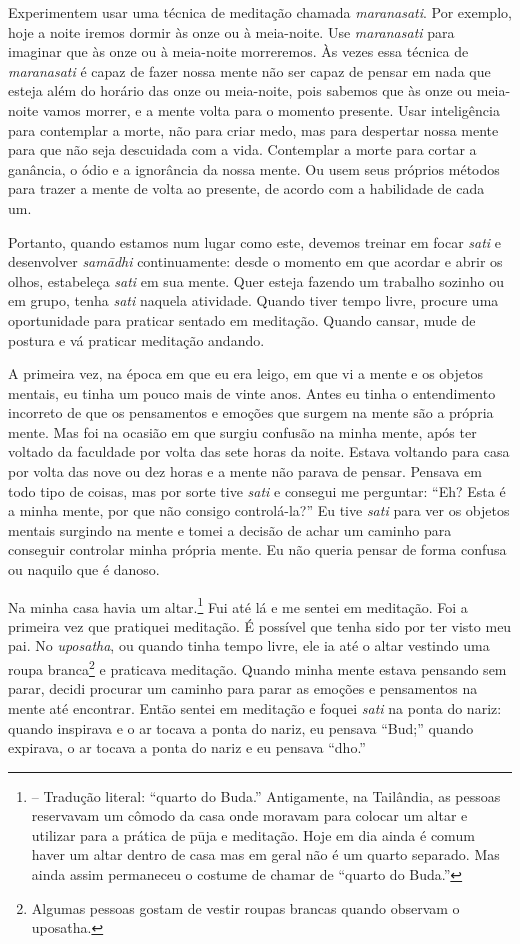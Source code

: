 Experimentem usar uma técnica de meditação chamada
\textit{maranasati}. Por exemplo, hoje a noite iremos dormir às onze ou
à meia-noite. Use \textit{maranasati} para imaginar que às onze ou à
meia-noite morreremos. Às vezes essa técnica de \textit{maranasati} é
capaz de fazer nossa mente não ser capaz de pensar em nada que esteja
além do horário das onze ou meia-noite, pois sabemos que às onze ou
meia-noite vamos morrer, e a mente volta para o momento presente. Usar
inteligência para contemplar a morte, não para criar medo, mas para
despertar nossa mente para que não seja descuidada com a vida.
Contemplar a morte para cortar a ganância, o ódio e a ignorância da
nossa mente. Ou usem seus próprios métodos para trazer a mente de volta
ao presente, de acordo com a habilidade de cada um.

Portanto, quando estamos num lugar como este, devemos treinar em
focar \textit{sati} e desenvolver \textit{samādhi} continuamente:
desde o momento em que acordar e abrir os olhos, estabeleça
\textit{sati} em sua mente. Quer esteja fazendo um trabalho sozinho ou
em grupo, tenha \textit{sati} naquela atividade. Quando tiver tempo
livre, procure uma oportunidade para praticar sentado em meditação.
Quando cansar, mude de postura e vá praticar meditação andando. 

A primeira vez, na época em que eu era leigo, em que vi a mente e os
objetos mentais, eu tinha um pouco mais de vinte anos. Antes eu tinha o
entendimento incorreto de que os pensamentos e emoções que surgem na
mente são a própria mente. Mas foi na ocasião em que surgiu confusão na
minha mente, após ter voltado da faculdade por volta das sete horas da
noite. Estava voltando para casa por volta das nove ou dez horas e a
mente não parava de pensar. Pensava em todo tipo de coisas, mas por
sorte tive \textit{sati} e consegui me perguntar: “Eh? Esta é a minha
mente, por que não consigo controlá-la?” Eu tive \textit{sati} para ver
os objetos mentais surgindo na mente e tomei a decisão de achar um
caminho para conseguir controlar minha própria mente. Eu não queria
pensar de forma confusa ou naquilo que é danoso.

Na minha casa havia um
altar.\footnote{ – Tradução
literal: “quarto do Buda.” Antigamente, na Tailândia, as pessoas
reservavam um cômodo da casa onde moravam para colocar um altar e
utilizar para a prática de pūja e meditação. Hoje em dia ainda é
comum haver um altar dentro de casa mas em geral não é um quarto
separado. Mas ainda assim permaneceu o costume de chamar de “quarto do
Buda.”} Fui até lá e me sentei em meditação. Foi a primeira vez que
pratiquei meditação. É possível que tenha sido por ter visto meu pai.
No \textit{uposatha}, ou quando tinha tempo livre, ele ia até o altar
vestindo uma roupa branca\footnote{Algumas pessoas gostam de vestir
roupas brancas quando observam o uposatha.} e praticava meditação.
Quando minha mente estava pensando sem parar, decidi procurar um
caminho para parar as emoções e pensamentos na mente até encontrar.
Então sentei em meditação e foquei \textit{sati} na ponta do nariz:
quando inspirava e o ar tocava a ponta do nariz, eu pensava “Bud;”
quando expirava, o ar tocava a ponta do nariz e eu pensava “dho.”

